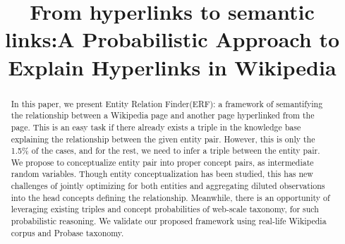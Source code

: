 \documentclass[letterpaper]{article}
\begin{document}
\title{From hyperlinks to semantic links:A Probabilistic Approach to Explain Hyperlinks in Wikipedia}




\maketitle
\begin{abstract}

In this paper, we present Entity Relation Finder(ERF): a framework of semantifying 
the relationship between a Wikipedia page and another page hyperlinked from the page.
This is an easy task if there already exists a triple in the knowledge base explaining the relationship
between the given entity pair.
However, this is only the 1.5\% of the cases, and for the rest, we need to infer a triple between the entity pair.
We propose to conceptualize entity pair into proper concept pairs, as intermediate random variables.
Though entity conceptualization has been studied, this has new challenges of jointly optimizing for both entities and aggregating diluted observations into the head concepts defining the relationship.
Meanwhile, there is an opportunity of leveraging existing triples and concept probabilities of web-scale taxonomy, for such probabilistic reasoning.
We validate our proposed framework using real-life Wikipedia corpus and Probase taxonomy.

\end{abstract}






%




%

\end{document}
